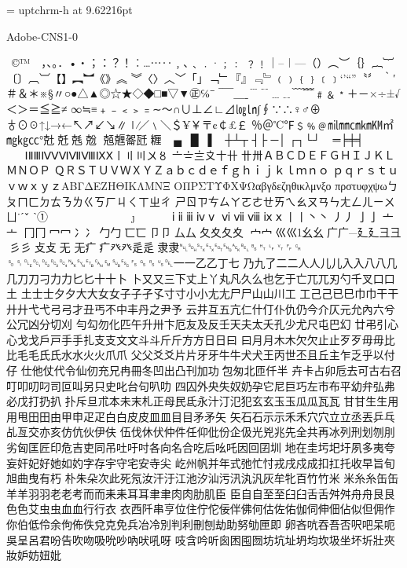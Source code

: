 %
%
%
%
\font\uptchrm = uptchrm-h at 9.62216pt
\uptchrm


Adobe-CNS1-0

 ©™　，、。．•‧；：？！︰…⋯‥﹐､﹑﹒·﹔﹕
﹖﹗｜–︱—（）︵︶｛｝︷︸〔〕︹︺【】︻︼《》︽
︾〈〉︿﹀「」﹁﹂『』﹃﹄﹙﹚﹛﹜﹝﹞‘’“”〝〞
‵′＃＆＊※§〃○●△▲◎☆★◇◆□■▽▼㊣℅¯̄
‾￣＿ˍ﹉﹊﹍﹎﹋﹌﹟﹠﹡＋－×÷±√＜＞＝≦≧≠
∞≒≡﹢﹣﹤﹥﹦∼～∩∪⊥∠∟⊿㏒㏑∫∮∵∴♀♂⊕
♁⊙☉↑↓→←↖↗↙↘∥∣∕／﹨＼＄¥￥〒¢￠£￡
％＠℃℉﹩﹪﹫㏕㎜㎝㎞㏎㎡㎎㎏㏄°兙兛兞兝
兡兣嗧瓩糎▁▂▃▄▅▆▇█▏▎▍▌▋▊▉┼┴┬
┤├▔─│▕┌┐└┘╭╮╰╯═╞╪╡◢◣◥◤╱╲╳
０１２３４５６７８９ⅠⅡⅢⅣⅤⅥⅦⅧⅨⅩ〡〢〣〤〥
〦〧〨〩〸卄〹〺ＡＢＣＤＥＦＧＨＩＪＫＬＭＮＯＰ
ＱＲＳＴＵＶＷＸＹＺａｂｃｄｅｆｇｈｉｊｋｌｍｎｏ
ｐｑｒｓｔｕｖｗｘｙｚΑΒΓΔΕΖΗΘΙΚΛΜΝΞ
ΟΠΡΣΤΥΦΧΨΩαβγδεζηθικλμνξο
πρστυφχψωㄅㄆㄇㄈㄉㄊㄋㄌㄍㄎㄏㄐㄑㄒㄓㄔ
ㄕㄖㄗㄘㄙㄚㄛㄜㄝㄞㄟㄠㄡㄢㄣㄤㄥㄦㄧㄨㄩ˙ˊˇ̌
ˋ①②③④⑤⑥⑦⑧⑨⑩⑴⑵
⑶⑷⑸⑹⑺⑻⑼⑽ⅰⅱⅲⅳⅴ
ⅵⅶⅷⅸⅹ丨⼁丶⼂丿⼃⼅亅⼇亠
冂⼌冖⼍冫⼎⼓勹⼖匸⼙卩⼛厶⼡⼢夂夊
⼧宀⼮巛幺⼳广⼴廴⼵彐⼹彡⼺⽁攴⽆
无疒⽧癶⽨⾡辵⾪隶␀␁␂␃␄␅␆␇␈␉␊␋␌␍
␎␏␐␑␒␓␔␕␖␗␘␙␚␛␜␝␞␟␡⼀一⼄乙丁七
乃九了⼆二人⼈儿⼉入⼊八⼋⼏几⼑刀刁⼒力⼔匕十⼗卜
⼘⼜又三下丈上丫丸凡久么也乞于亡兀兀刃勺千叉⼝口土
⼟士⼠夕⼣大⼤女⼥⼦子孑孓寸⼨小⼩尢⼪尸⼫⼭山川工
⼯⼰己已巳巾⼱干⼲廾⼶弋⼷弓⼸才丑丐不中丰丹之尹予
云井互五亢仁什仃仆仇仍今介仄元允內六兮公冗凶分切刈
勻勾勿化匹午升卅卞厄友及反壬天夫太夭孔少尤尺屯巴幻
廿弔引心⼼戈⼽戶⼾手⼿扎⽀支文⽂斗⽃斤⽄方⽅日⽇曰
⽈月⽉木⽊欠⽋止⽌歹⽍毋⽏比⽐毛⽑氏⽒水⽔火⽕爪⽖
父⽗爻⽘片⽚牙⽛牛⽜犬⽝王丙世丕且丘主乍乏乎以付仔
仕他仗代令仙仞充兄冉冊冬凹出凸刊加功包匆北匝仟半
卉卡占卯卮去可古右召叮叩叨叼司叵叫另只史叱台句叭叻
四囚外央失奴奶孕它尼巨巧左市布平幼弁弘弗必戊打扔扒
扑斥旦朮本未末札正母民氐永汁汀氾犯玄⽞玉⽟瓜⽠瓦⽡
甘⽢生⽣⽤用甩⽥田由甲申⽦疋白⽩皮⽪皿⽫目⽬矛⽭矢
⽮石⽯示⽰禾⽲穴⽳立⽴丞丟乒乓乩亙交亦亥仿伉伙伊伕
伍伐休伏仲件任仰仳份企伋光兇兆先全共再冰列刑划刎刖
劣匈匡匠印危吉吏同吊吐吁吋各向名合吃后吆吒因回囝圳
地在圭圬圯圩夙多夷夸妄奸妃好她如妁字存宇守宅安寺尖
屹州帆并年式弛忙忖戎戌戍成扣扛托收早旨旬旭曲曳有朽
朴朱朵次此死氖汝汗汙江池汐汕污汛汍汎灰牟牝百竹⽵米
⽶糸⽷缶⽸羊⽺羽⽻老⽼考而⽽耒⽾耳⽿聿⾀肉⾁肋肌臣
⾂自⾃至⾄臼⾅舌⾆舛⾇舟⾈艮⾉色⾊艾虫⾍血⾎行⾏衣
⾐西阡串亨位住佇佗佞伴佛何估佐佑伽伺伸佃佔似但佣作
你伯低伶余佝佈佚兌克免兵冶冷別判利刪刨劫助努劬匣即
卵吝吭吞吾否呎吧呆呃吳呈呂君吩告吹吻吸吮吵吶吠吼呀
吱含吟听囪困囤囫坊坑址坍均坎圾坐坏圻壯夾妝妒妨妞妣
